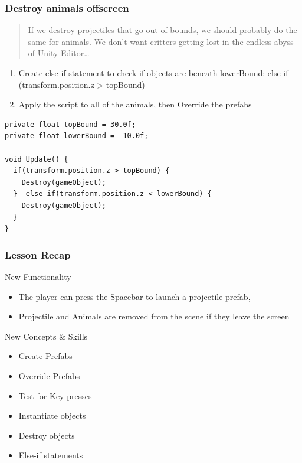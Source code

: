 \documentclass[
]{book}
\providecommand{\tightlist}{%
  \setlength{\itemsep}{0pt}\setlength{\parskip}{0pt}}
\begin{document}
\hypertarget{destroy-animals-offscreen}{%
\subsubsection{Destroy animals offscreen}\label{destroy-animals-offscreen}}

\begin{quote}
If we destroy projectiles that go out of bounds, we should probably do the same for animals. We don't want critters getting lost in the endless abyss of Unity Editor\ldots{}
\end{quote}

\begin{enumerate}
\def\labelenumi{\arabic{enumi}.}
\tightlist
\item
  Create else-if statement to check if objects are beneath lowerBound:
  else if (transform.position.z \textgreater{} topBound)
\item
  Apply the script to all of the animals, then Override the prefabs
\end{enumerate}

\begin{verbatim}
private float topBound = 30.0f;
private float lowerBound = -10.0f;

void Update() {
  if(transform.position.z > topBound) {
    Destroy(gameObject);
  }  else if(transform.position.z < lowerBound) {
    Destroy(gameObject);
  }
}
\end{verbatim}

\hypertarget{lesson-recap-1}{%
\subsubsection{Lesson Recap}\label{lesson-recap-1}}

New Functionality

\begin{itemize}
\tightlist
\item
  The player can press the Spacebar to launch a projectile prefab,
\item
  Projectile and Animals are removed from the scene if they leave the screen
\end{itemize}

New Concepts \& Skills

\begin{itemize}
\tightlist
\item
  Create Prefabs
\item
  Override Prefabs
\item
  Test for Key presses
\item
  Instantiate objects
\item
  Destroy objects
\item
  Else-if statements
\end{itemize}
\end{document}
